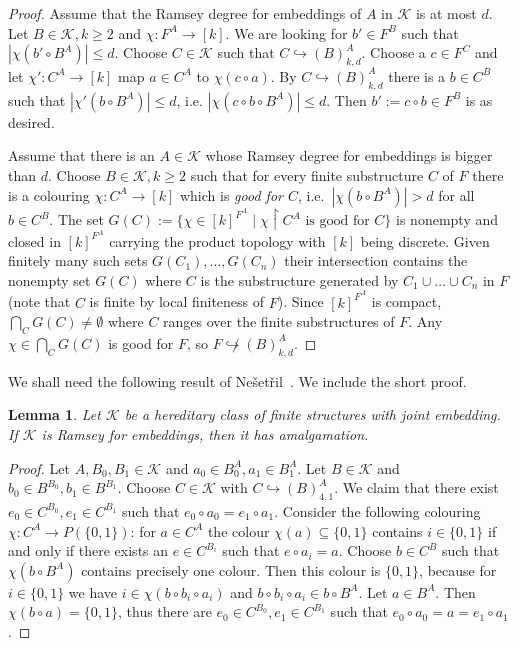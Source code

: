 \documentclass[12pt]{amsart}
\theoremstyle{plain}
\newtheorem{lemma}[theorem]{Lemma}
\theoremstyle{definition}
\begin{document}
\begin{proof} Assume that the Ramsey degree for embeddings of $A$ in ${\mathcal K}$ is at most $d$. Let $B\in{\mathcal K}, k\ge 2$ and 
$\chi:F^A\to[k]$. We are looking for $b'\in F^B$ such that $|\chi(b'\circ B^A)|\le d$.
Choose $C\in{\mathcal K}$ such that $C\hookrightarrow (B)_{k,d}^A$. Choose a $c\in F^C$ and let 
$\chi':C^A\to[k]$ map $a\in C^A$ to $\chi(c\circ a)$. By $C\hookrightarrow (B)_{k,d}^A$ there is a $b\in C^B$ 
such that $|\chi'(b\circ B^A)|\le d$, i.e. $|\chi(c\circ b\circ B^A)|\le d$. Then $b':=c\circ b\in F^B$ is as desired.

Assume  that there is an $A\in{\mathcal K}$ whose Ramsey degree for embeddings is bigger than $d$. Choose  $B\in{\mathcal K}, k\ge 2$ such 
that for every finite substructure $C$ of $F$ there is a colouring 
$\chi:C^A\to[k]$ which is {\em good for $C$}, i.e.\ $|\chi(b\circ B^A)|> d$ for all $b\in C^B$. 
The set $G(C):=\{\chi\in [k]^{F^A}\mid \chi\upharpoonright C^A\textrm{ is good for } C\}$ is nonempty and closed in $[k]^{F^A}$ carrying 
the product topology with $[k]$ being discrete. Given finitely many such sets $G(C_1),\ldots,G(C_n)$ their intersection 
contains the nonempty set $G(C)$ where $C$ is the substructure generated by $C_1\cup\ldots\cup C_n$ in $F$ 
(note that $C$ is finite by local finiteness of $F$). Since $[k]^{F^A}$ is compact, 
$\bigcap_CG(C)\neq\emptyset$ where $C$ ranges over the finite substructures of $F$. 
Any $\chi\in \bigcap_CG(C)$ is good for $F$, so $F\not\hookrightarrow (B)^A_{k,d}$. 
\end{proof}

We shall need the following result of Ne\v{s}et\v{r}il~\cite[T3.2]{nesetril}. 
We include the short proof.

\begin{lemma}\label{lem:Ramam} Let ${\mathcal K}$ be a hereditary class of finite structures with joint embedding. If ${\mathcal K}$ is Ramsey for embeddings, then it has amalgamation.
\end{lemma}

\begin{proof} Let $A,B_0,B_1\in{\mathcal K}$ and $a_0\in B_0^A, a_1\in B_1^A$. Let $B\in{\mathcal K}$ and $b_0\in B^{B_0},b_1\in B^{B_1}$. Choose $C\in {\mathcal K}$ with $C\hookrightarrow(B)_{4,1}^{A}$. We claim that there exist $e_0\in C^{B_0},e_1\in C^{B_1}$ such that $e_0\circ a_0=e_1\circ a_1$. Consider the following colouring $\chi:C^A\to P(\{0,1\})$: for $a\in C^A$ the colour $\chi(a)\subseteq \{0,1\}$ contains $i\in\{0,1\}$ if and only if there exists an $e\in C^{B_i}$ such that $e\circ a_i=a$. Choose $b\in C^B$ such that $\chi(b\circ B^A)$ contains precisely one colour. 
Then this colour is $\{0,1\}$, because for $i\in\{0,1\}$ we have $i\in\chi(b\circ b_i \circ a_i)$ and $b\circ b_i \circ a_i\in b\circ B^A$. Let $a\in B^A$. Then $\chi(b\circ a)=\{0,1\}$, thus there are $e_0\in C^{B_0},e_1\in C^{B_1}$ such that $e_0\circ a_0=a=e_1\circ a_1$.
\end{proof}
\end{document}
